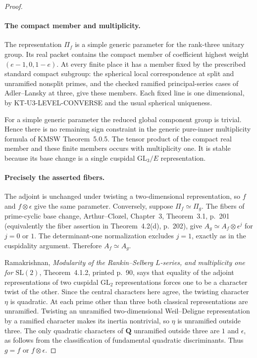 \begin{proof}
\paragraph{The compact member and multiplicity.}
The representation $\Pi_f$ is a simple generic parameter for
the rank-three unitary group.  Its real packet contains the
compact member of coefficient highest weight $(e-1,0,1-e)$.
At every finite place it has a member fixed by the prescribed
standard compact subgroup: the spherical local correspondence
at split and unramified nonsplit primes, and the checked
ramified principal-series cases of Adler--Lansky at three,
give these members.  Each fixed line is one dimensional,
by KT-U3-LEVEL-CONVERSE and the usual spherical uniqueness.

For a simple generic parameter the reduced global component
group is trivial.  Hence there is no remaining sign constraint
in the generic pure-inner multiplicity formula of KMSW
Theorem~5.0.5.  The tensor product of the compact real member
and these finite members occurs with multiplicity one.  It
is stable because its base change is a single cuspidal
$\mathrm{GL}_3/E$ representation.

\paragraph{Precisely the asserted fibers.}
The adjoint is unchanged under twisting a two-dimensional
representation, so $f$ and $f\otimes\epsilon$ give the same
parameter.  Conversely, suppose $\Pi_f\simeq\Pi_g$.
The fibers of prime-cyclic base change, Arthur--Clozel,
Chapter~3, Theorem~3.1, p.~201 (equivalently the fiber assertion
in Theorem~4.2(d), p.~202), give
$A_g\simeq A_f\otimes\epsilon^j$ for $j=0$ or $1$.
The determinant-one normalization excludes $j=1$, exactly
as in the cuspidality argument.  Therefore $A_f\simeq A_g$.

Ramakrishnan, \emph{Modularity of the Rankin--Selberg $L$-series,
and multiplicity one for $\mathrm{SL}(2)$},
Theorem~4.1.2, printed p.~90, says that equality of the adjoint
representations of two cuspidal $\mathrm{GL}_2$ representations
forces one to be a character twist of the other.  Since the
central characters here agree, the twisting character $\eta$
is quadratic.  At each prime other than three both classical
representations are unramified.  Twisting an unramified
two-dimensional Weil--Deligne representation by a ramified
character makes its inertia nontrivial, so $\eta$ is unramified
outside three.  The only quadratic characters of $\mathbf Q$
unramified outside three are $1$ and $\epsilon$, as follows
from the classification of fundamental quadratic discriminants.
Thus $g=f$ or $f\otimes\epsilon$.


\end{proof}
